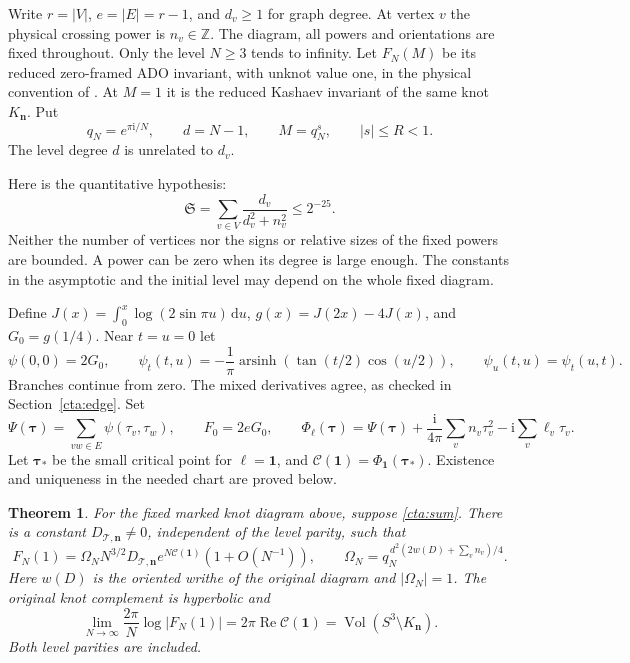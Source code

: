 \documentclass[11pt]{article}
\numberwithin{equation}{section}
\newtheorem{theorem}{Theorem}[section]
\theoremstyle{definition}\newtheorem{definition}[theorem]{Definition}
\theoremstyle{remark}\newtheorem{remark}[theorem]{Remark}
\newcommand{\ii}{\mathrm i}
\newcommand{\dd}{\mathrm d}
\newcommand{\Rea}{\operatorname{Re}}
\newcommand{\Vol}{\operatorname{Vol}}
\newcommand{\calC}{\mathcal C}
\begin{document}
Write \(r=|V|\), \(e=|E|=r-1\), and \(d_v\ge1\) for graph degree.
At vertex \(v\) the physical crossing power is \(n_v\in\mathbb Z\).
The diagram, all powers and orientations are fixed throughout.
Only the level \(N\ge3\) tends to infinity. Let \(F_N(M)\) be its
reduced zero-framed ADO invariant, with unknot value one, in the
physical convention of \cite{Meridian}. At \(M=1\) it is the reduced
Kashaev invariant of the same knot \(K_{\mathbf n}\). Put
\[
 q_N=e^{\pi\ii/N},\qquad d=N-1,\qquad M=q_N^s,\qquad |s|\le R<1.
\]
The level degree \(d\) is unrelated to \(d_v\).

Here is the quantitative hypothesis:
\begin{equation}\label{cta:sum}
 \mathfrak S=\sum_{v\in V}\frac{d_v}{d_v^2+n_v^2}\le2^{-25}.
\end{equation}
Neither the number of vertices nor the signs or relative sizes of
the fixed powers are bounded. A power can be zero when its degree is
large enough. The constants in the asymptotic and the initial level
may depend on the whole fixed diagram.

Define \(J(x)=\int_0^x\log(2\sin\pi u)\,\dd u\),
\(g(x)=J(2x)-4J(x)\), and \(G_0=g(1/4)\). Near \(t=u=0\) let
\begin{equation}\label{cta:psi-definition}
 \psi(0,0)=2G_0,\qquad
 \psi_t(t,u)=-\frac1\pi
     \operatorname{arsinh}\!\left(\tan(t/2)\cos(u/2)\right),
 \qquad\psi_u(t,u)=\psi_t(u,t).
\end{equation}
Branches continue from zero. The mixed derivatives agree, as checked
in Section~\ref{cta:edge}. Set
\[
 \Psi(\boldsymbol\tau)=\sum_{vw\in E}\psi(\tau_v,\tau_w),
 \qquad F_0=2eG_0,\qquad
 \Phi_{\boldsymbol\ell}(\boldsymbol\tau)
 =\Psi(\boldsymbol\tau)+\frac{\ii}{4\pi}
       \sum_v n_v\tau_v^2-\ii\sum_v\ell_v\tau_v .
\]
Let \(\boldsymbol\tau_*\) be the small critical point for
\(\boldsymbol\ell=\mathbf1\), and
\(\calC(\mathbf1)=\Phi_{\mathbf1}(\boldsymbol\tau_*)\).
Existence and uniqueness in the needed chart are proved below.

\begin{theorem}\label{cta:main}
For the fixed marked knot diagram above, suppose \eqref{cta:sum}.
There is a constant \(D_{\mathcal T,\mathbf n}\ne0\), independent
of the level parity, such that
\begin{equation}\label{cta:leading}
 F_N(1)=\Omega_N N^{3/2}D_{\mathcal T,\mathbf n}
            e^{N\calC(\mathbf1)}(1+O(N^{-1})),\qquad
 \Omega_N=q_N^{\,d^2(2w(D)+\sum_vn_v)/4}.
\end{equation}
Here \(w(D)\) is the oriented writhe of the original diagram and
\(|\Omega_N|=1\).
The original knot complement is hyperbolic and
\begin{equation}\label{cta:volume}
 \lim_{N\to\infty}\frac{2\pi}{N}\log|F_N(1)|
       =2\pi\Rea\calC(\mathbf1)
       =\Vol(S^3\setminus K_{\mathbf n}).
\end{equation}
Both level parities are included.
\end{theorem}
\end{document}
